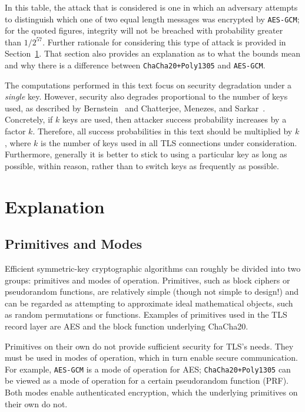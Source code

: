 \documentclass{article}
\begin{document}
In this table, the attack that is considered is one in which an adversary attempts to distinguish which one of two equal length messages was encrypted by \texttt{AES-GCM}; for the quoted figures, integrity will not be breached with probability greater than $1/2^{57}$. Further rationale for considering this type of attack is provided in Section~\ref{sec:explanation}. That section also provides an explanation as to what the bounds mean and why there is a difference between \texttt{ChaCha20+Poly1305} and \texttt{AES-GCM}.

The computations performed in this text focus on security degradation under a \emph{single} key. However, security also degrades proportional to the number of keys used, as described by Bernstein~\cite{bernsteinblog} and Chatterjee, Menezes, and Sarkar~\cite{DBLP:conf/sacrypt/ChatterjeeMS11,DBLP:journals/iacr/ChatterjeeMS11}. Concretely, if $k$ keys are used, then attacker success probability increases by a factor $k$. Therefore, all success probabilities in this text should be multiplied by $k$, where $k$ is the number of keys used in all TLS connections under consideration. Furthermore, generally it is better to stick to using a particular key as long as possible, within reason, rather than to switch keys as frequently as possible.

\section{Explanation}\label{sec:explanation}

\subsection{Primitives and Modes}
Efficient symmetric-key cryptographic algorithms can roughly be divided into two groups: primitives and modes of operation. Primitives, such as block ciphers or pseudorandom functions, are relatively simple (though not simple to design!) and can be regarded as attempting to approximate ideal mathematical objects, such as random permutations or functions. Examples of primitives used in the TLS record layer are AES and the block function underlying ChaCha20. 

Primitives on their own do not provide sufficient security for TLS's needs. They must be used in modes of operation, which in turn enable secure communication. For example, \texttt{AES-GCM} is a mode of operation for AES; \texttt{ChaCha20+Poly1305} can be viewed as a mode of operation for a certain pseudorandom function (PRF). Both modes enable authenticated encryption, which the underlying primitives on their own do not.
\end{document}

